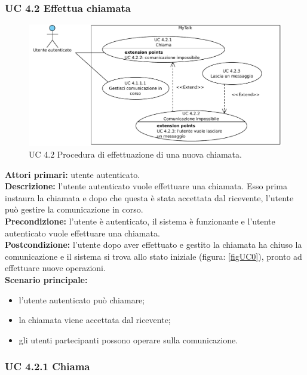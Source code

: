 \subsubsection{UC 4.2 Effettua chiamata}

\begin{figure}[htbp]
\centering
\includegraphics[scale=0.7]{./casi_uso/UC4-2.pdf}
\caption{UC 4.2 Procedura di effettuazione di una nuova chiamata.}
\end{figure}

\noindent
\textbf{Attori primari:} utente autenticato.\\
\textbf{Descrizione:} l'utente autenticato vuole effettuare una chiamata. Esso prima instaura la chiamata e dopo che questa è stata accettata dal ricevente, l'utente può gestire la comunicazione in corso. \\
\textbf{Precondizione:} l'utente è autenticato, il sistema è funzionante e l'utente autenticato vuole effettuare una chiamata.\\
\textbf{Postcondizione:} l'utente dopo aver effettuato e gestito la chiamata ha chiuso la comunicazione e il sistema si trova allo stato iniziale (figura: \ref{figUC0}), pronto ad effettuare nuove operazioni.\\
\textbf{Scenario principale:}
\begin{itemize}
\item l'utente autenticato può chiamare;
\item la chiamata viene accettata dal ricevente;
\item gli utenti partecipanti possono operare sulla comunicazione.
\end{itemize}

\newpage

\subsubsection{UC 4.2.1 Chiama}


